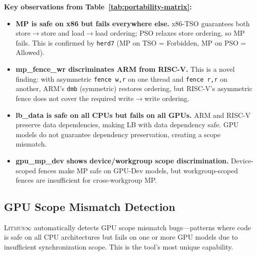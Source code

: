 \documentclass[10pt]{article}
\newcommand{\litmus}{\textsc{Litmus$\infty$}}
\begin{document}
\textbf{Key observations from Table~\ref{tab:portability-matrix}:}
\begin{itemize}[nosep]
\item \textbf{MP is safe on x86 but fails everywhere else.} x86-TSO
      guarantees both store$\to$store and load$\to$load ordering; PSO
      relaxes store ordering, so MP fails. This is confirmed by
      \texttt{herd7} (MP on TSO = Forbidden, MP on PSO = Allowed).
\item \textbf{mp\_fence\_wr discriminates ARM from RISC-V.} This is a
      novel finding: with asymmetric \texttt{fence~w,r} on one thread
      and \texttt{fence~r,r} on another, ARM's \texttt{dmb} (symmetric)
      restores ordering, but RISC-V's asymmetric fence does not cover
      the required write$\to$write ordering.
\item \textbf{lb\_data is safe on all CPUs but fails on all GPUs.}
      ARM and RISC-V preserve data dependencies, making LB with data
      dependency safe. GPU models do not guarantee dependency
      preservation, creating a scope mismatch.
\item \textbf{gpu\_mp\_dev shows device/workgroup scope discrimination.}
      Device-scoped fences make MP safe on GPU-Dev models, but
      workgroup-scoped fences are insufficient for cross-workgroup MP.
\end{itemize}

\subsection{GPU Scope Mismatch Detection}
\label{sec:gpu-scope}

\litmus{} automatically detects GPU scope mismatch bugs---patterns
where code is safe on all CPU architectures but fails on one or more
GPU models due to insufficient synchronization scope. This is the
tool's most unique capability.
\end{document}

